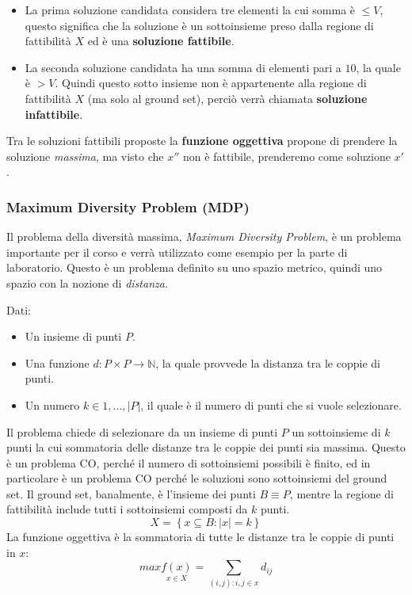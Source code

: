 \documentclass{article}
\begin{document}
\begin{itemize}
    \item La prima soluzione candidata considera tre elementi la cui somma è $\leq V$, questo significa che la
          soluzione è un sottoinsieme preso dalla regione di fattibilità $X$ ed è una \textbf{soluzione fattibile}.
    \item La seconda soluzione candidata ha una somma di elementi pari a $10$, la quale è $>V$. Quindi questo sotto insieme
          non è appartenente alla regione di fattibilità $X$ (ma solo al ground set), perciò verrà chiamata \textbf{soluzione infattibile}.
\end{itemize}

Tra le soluzioni fattibili proposte la \textbf{funzione oggettiva} propone di prendere la soluzione \textit{massima}, ma visto che $x''$ non è fattibile, prenderemo come soluzione $x'$.
\subsubsection{Maximum Diversity Problem (MDP)}
Il problema della diversità massima, \textit{Maximum Diversity Problem}, è un problema importante per il corso e
verrà utilizzato come esempio per la parte di laboratorio. Questo è un problema
definito su uno spazio metrico, quindi uno spazio con la nozione di \textit{distanza}.

Dati:
\begin{itemize}
    \item Un insieme di punti $P$.
    \item Una funzione $d:P \times P \rightarrow \mathbb{N}$, la quale provvede la distanza tra le coppie di punti.
    \item Un numero $k\in {1,...,|P|}$, il quale è il numero di punti che si vuole selezionare.
\end{itemize}

Il problema chiede di selezionare da un insieme di punti $P$ un sottoinsieme di $k$ punti la cui sommatoria delle distanze tra le coppie dei punti sia massima.
Questo è un problema CO, perché il numero di sottoinsiemi possibili è finito, ed in particolare è un problema CO perché le soluzioni sono sottoinsiemi del ground set.
Il ground set, banalmente, è l'insieme dei punti $B\equiv P$, mentre la regione di fattibilità include tutti i sottoinsiemi composti da $k$ punti.
$$X=\left\{x\subseteq B : |x| = k \right\}$$
La funzione oggettiva è la sommatoria di tutte le distanze tra le coppie di punti in $x$:
$$max\underset{x\in X}{f(x)}=\sum_{(i,j):i,j\in x}d_{ij}$$
\end{document}

